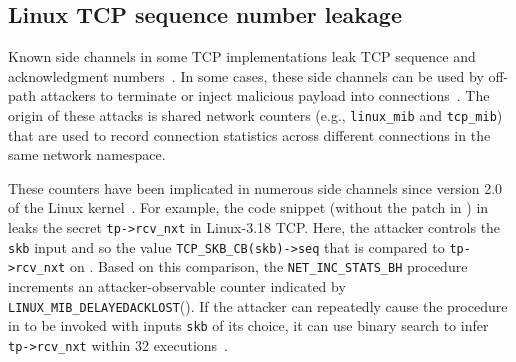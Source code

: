 \newcommand{\tcpmib}{\texttt{tcp\_mib}\xspace}
\newcommand{\linuxmib}{\texttt{linux\_mib}\xspace}
\newcommand{\tcprcvfunc}{\texttt{tcp\_rcv\_established}\xspace}
\newcommand{\tcpparseoption}{\texttt{tcp\_parse\_options}\xspace}
\newcommand{\sk}{\texttt{sk}\xspace}
\newcommand{\skb}{\texttt{skb}\xspace}
\newcommand{\tcphdr}{\texttt{th}\xspace}
\newcommand{\len}{\texttt{len}\xspace}
\newcommand{\tcpseq}{\texttt{tp->rcv\_nxt}\xspace}
\newcommand{\tcpack}{\texttt{tp->snd\_nxt}\xspace}
\newcommand{\tcprcvwnd}{\texttt{tp->rcv\_wnd}\xspace}
\newcommand{\tcpsndwnd}{\texttt{tp->snd\_wnd}\xspace}
\newcommand{\skbseq}{\texttt{TCP\_SKB\_CB(skb)->seq}\xspace}
\newcommand{\skbendseq}{\texttt{TCP\_SKB\_CB(skb)->end\_seq}\xspace}
\newcommand{\skback}{\texttt{TCP\_SKB\_CB(skb)->ack\_seq}\xspace}
\newcommand{\tcpflagword}{\texttt{tcp\_flag\_word(th)}\xspace}
\newcommand{\maxtcpwnd}{\texttt{MAX\_TCP\_WINDOW}\xspace}
\newcommand{\fillpkg}{\texttt{fill\_packet}\xspace}
\newcommand{\tcpinitsock}{\texttt{tcp\_init\_sock}\xspace}
\newcommand{\netincstatsbh}{\texttt{NET\_INC\_STATS\_BH}\xspace}
\newcommand{\linuxmibdelayedacklost}{\texttt{LINUX\_MIB\_DELAYEDACKLOST}\xspace}

\subsection{Linux TCP sequence number leakage}
\label{sscf:sec:case-studies:tcp}

Known side channels in some TCP implementations leak TCP sequence and
acknowledgment numbers~\cite{tcp:1985,Qian:2012:CTS}.  In some cases,
these side channels can be used by off-path attackers to terminate or
inject malicious payload into
connections~\cite{zhiyun:2016,Qian:2012:CTS}.  The origin of these
attacks is shared network counters (e.g., \linuxmib and \tcpmib) that
are used to record connection statistics across different connections
in the same network namespace.

These counters have been implicated in numerous side channels since
version 2.0 of the Linux kernel~\cite{tcp:1999}.  For example, the
code snippet (without the patch in
) in  leaks
the secret \tcpseq in Linux-3.18 TCP.  Here, the attacker controls the
\skb input and so the value \skbseq that is compared to \tcpseq on
.  Based on this comparison, the \netincstatsbh
procedure increments an attacker-observable counter indicated by
\linuxmibdelayedacklost ().
If the attacker can repeatedly cause the procedure in
 to be invoked with inputs \skb of its choice, it can
use binary search to infer \tcpseq within 32
executions~\cite{Qian:2012:CTS}.


